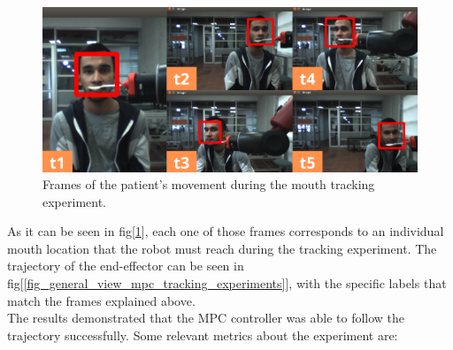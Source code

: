 \documentclass[11pt]{report} %
\begin{document}
\begin{figure}[H]
    \centering
    \includegraphics[width=1.0\linewidth]{assets/imgs/control_theory/mpc_tracking/real_mouth_tracking.png}
    \caption{Frames of the patient's movement during the mouth tracking experiment.} 
    \label{fig_real_mpc_mouth_tracking_experiments}
\end{figure}

As it can be seen in fig[\ref{fig_real_mpc_mouth_tracking_experiments}], each one of those frames corresponds to an individual mouth location that the robot must reach during the tracking experiment. The trajectory of the end-effector can be seen in fig[\ref{fig_general_view_mpc_tracking_experiments}], with the specific labels  that match the frames explained above. \\

The results demonstrated that the MPC controller was able to follow the trajectory successfully. Some relevant metrics about the experiment are:

\begin{table}[H]
\begin{center}
\caption{\label{tab:performance_metrics_tracking} Performance metrics for mouth tracking experiment.}
\end{center}
\end{table}
\end{document}
